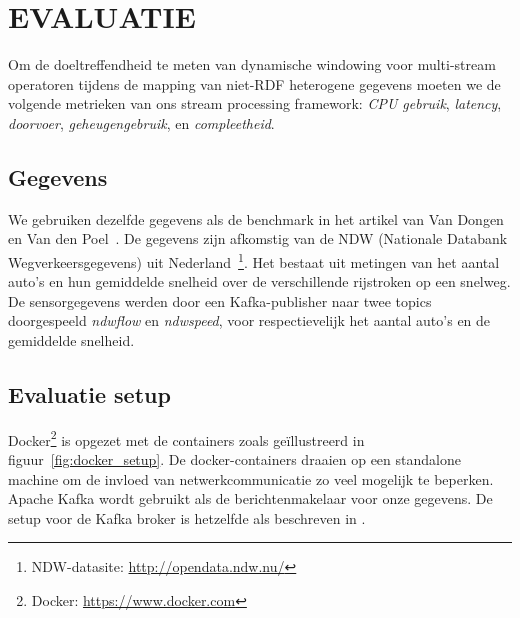 \section{EVALUATIE}
\label{chap:Evaluation}

Om de doeltreffendheid te meten van dynamische windowing voor multi-stream operatoren tijdens de 
mapping van niet-RDF heterogene gegevens moeten we de volgende 
metrieken van ons stream processing framework: \emph{CPU gebruik}, \emph{latency}, \emph{doorvoer},
\emph{geheugengebruik}, en \emph{compleetheid}. 

\subsection{Gegevens}
We gebruiken dezelfde gegevens 
als de benchmark in het artikel van Van Dongen en Van den Poel~\cite{evalution_of_spe}. 
De gegevens zijn afkomstig van de NDW (Nationale Databank Wegverkeersgegevens) uit 
Nederland~\footnote{NDW-datasite: \href{http://opendata.ndw.nu/}{http://opendata.ndw.nu/} }.
Het bestaat uit metingen van het aantal auto's en hun gemiddelde snelheid over de verschillende 
rijstroken op een snelweg. 
De sensorgegevens werden door een Kafka-publisher naar twee topics doorgespeeld 
\emph{ndwflow} en \emph{ndwspeed}, voor respectievelijk het aantal auto's en de gemiddelde snelheid.

\subsection{Evaluatie setup}

Docker\footnote{Docker: \url{https://www.docker.com}} is 
opgezet met de containers 
zoals geïllustreerd in figuur~\ref{fig:docker_setup}. De docker-containers 
draaien op een standalone machine om de invloed van 
netwerkcommunicatie zo veel mogelijk te beperken. Apache Kafka wordt gebruikt 
als de berichtenmakelaar voor onze gegevens. De setup voor de Kafka broker is 
hetzelfde als beschreven in \cite{evalution_of_spe}. 




